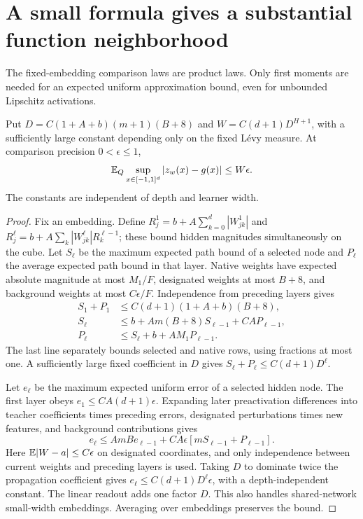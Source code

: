 \section{A small formula gives a substantial function neighborhood}
\label{sec:formula-uniform-mass}
The fixed-embedding comparison laws are product laws. Only first moments are needed for an expected uniform approximation bound, even for unbounded Lipschitz activations.

\begin{lemma}
\label{lem:formula-uniform-error}
Put $D=C(1+A+b)(m+1)(B+8)$ and $W=C(d+1)D^{H+1}$, with a sufficiently large constant depending only on the fixed L\'evy measure. At comparison precision $0<\epsilon\le1$,
\[
 \mathbb E_Q\sup_{x\in[-1,1]^d}|z_w(x)-g(x)|\le W\epsilon.
\]
The constants are independent of depth and learner width.
\end{lemma}
\begin{proof}
Fix an embedding. Define $R_j^1=b+A\sum_{k=0}^d|W^1_{jk}|$ and $R_j^\ell=b+A\sum_k|W^\ell_{jk}|R_k^{\ell-1}$; these bound hidden magnitudes simultaneously on the cube. Let $S_\ell$ be the maximum expected path bound of a selected node and $P_\ell$ the average expected path bound in that layer. Native weights have expected absolute magnitude at most $M_1/F$, designated weights at most $B+8$, and background weights at most $C\epsilon/F$. Independence from preceding layers gives
\begin{align*}
 S_1+P_1&\le C(d+1)(1+A+b)(B+8),\\
 S_\ell&\le b+Am(B+8)S_{\ell-1}+CA P_{\ell-1},\\
 P_\ell&\le S_\ell+b+AM_1P_{\ell-1}.
\end{align*}
The last line separately bounds selected and native rows, using fractions at most one. A sufficiently large fixed coefficient in $D$ gives $S_\ell+P_\ell\le C(d+1)D^\ell$.

Let $e_\ell$ be the maximum expected uniform error of a selected hidden node. The first layer obeys $e_1\le CA(d+1)\epsilon$. Expanding later preactivation differences into teacher coefficients times preceding errors, designated perturbations times new features, and background contributions gives
\[
 e_\ell\le AmB e_{\ell-1}+CA\epsilon[mS_{\ell-1}+P_{\ell-1}].
\]
Here $\mathbb E|W-a|\le C\epsilon$ on designated coordinates, and only independence between current weights and preceding layers is used. Taking $D$ to dominate twice the propagation coefficient gives $e_\ell\le C(d+1)D^\ell\epsilon$, with a depth-independent constant. The linear readout adds one factor $D$. This also handles shared-network small-width embeddings. Averaging over embeddings preserves the bound.
\end{proof}

